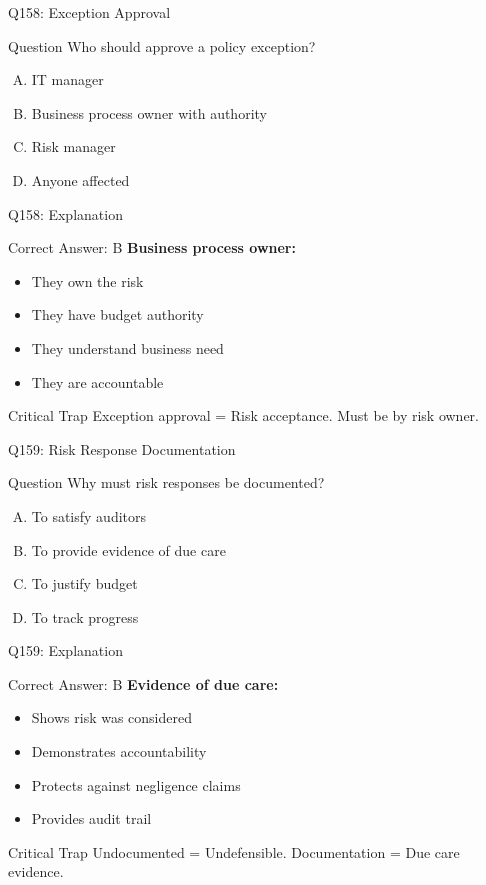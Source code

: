 \documentclass{beamer}
\begin{document}
	\begin{frame}{Q158: Exception Approval}
		\begin{block}{Question}
			Who should approve a policy exception?
		\end{block}
		\begin{enumerate}[(A)]
			\item IT manager
			\item Business process owner with authority
			\item Risk manager
			\item Anyone affected
		\end{enumerate}
	\end{frame}
	
	\begin{frame}{Q158: Explanation}
		\begin{block}{Correct Answer: B}
			\textbf{Business process owner:}
			\begin{itemize}
				\item They own the risk
				\item They have budget authority
				\item They understand business need
				\item They are accountable
			\end{itemize}
		\end{block}
		\begin{alertblock}{Critical Trap}
			Exception approval = Risk acceptance.
			Must be by risk owner.
		\end{alertblock}
	\end{frame}
	
	\begin{frame}{Q159: Risk Response Documentation}
		\begin{block}{Question}
			Why must risk responses be documented?
		\end{block}
		\begin{enumerate}[(A)]
			\item To satisfy auditors
			\item To provide evidence of due care
			\item To justify budget
			\item To track progress
		\end{enumerate}
	\end{frame}
	
	\begin{frame}{Q159: Explanation}
		\begin{block}{Correct Answer: B}
			\textbf{Evidence of due care:}
			\begin{itemize}
				\item Shows risk was considered
				\item Demonstrates accountability
				\item Protects against negligence claims
				\item Provides audit trail
			\end{itemize}
		\end{block}
		\begin{alertblock}{Critical Trap}
			Undocumented = Undefensible.
			Documentation = Due care evidence.
		\end{alertblock}
	\end{frame}
	
\end{document}
